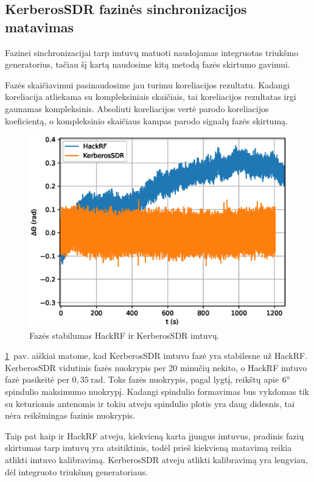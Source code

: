 \documentclass[main.tex]{subfiles}
\begin{document}
\subsection{KerberosSDR fazinės sinchronizacijos matavimas}

Fazinei sinchronizacijai tarp imtuvų matuoti naudojamas integruotas triukšmo generatorius,
tačiau šį kartą naudosime kitą metodą fazės skirtumo gavimui.

Fazės skaičiavimui pasinaudosime jau turimu koreliacijos rezultatu. Kadangi koreliacija
atliekama su kompleksiniais skaičiais, tai koreliacijos rezultatas irgi gaunamas kompleksinis.
Absoliuti koreliacijos vertė parodo koreliacijos koeficientą, o kompleksinio skaičiaus kampas
parodo signalų fazės skirtumą.

\begin{figure}[h]
    \begin{centering}
    \includegraphics[scale=1.0]{drawings/hackrdf_vs_kerberos_phase_over_time.eps}
    \par\end{centering}
    \protect\caption{\label{fig:phase_stability}Fazės stabilumas HackRF ir KerberosSDR imtuvų.}
\end{figure}

\ref{fig:phase_stability}~pav. aiškiai matome, kad KerberosSDR imtuvo fazė yra 
stabilesne už HackRF. KerberosSDR vidutinis fazės nuokrypis per 20 minučių nekito,
o HackRF imtuvo fazė pasikeitė per $0,35\ \mathrm{rad}$. Toks fazės nuokrypis, pagal
 lygtį, reikštų apie $6\degree$ spindulio maksimumo nuokrypį.
Kadangi spindulio formavimas bus vykdomas tik su keturiomis antenomis ir tokiu atveju
spindulio plotis yra daug didesnis, tai nėra reikšmingas fazinis nuokrypis.

Taip pat kaip ir HackRF atveju, kiekvieną karta įjungus imtuvus, pradinis fazių skirtumas
tarp imtuvų yra atsitiktinis, todėl prieš kiekvieną matavimą reikia atlikti imtuvo kalibravimą.
KerberosSDR atveju atlikti kalibravimą yra lengviau, dėl integruoto triukšmų generatoriaus.
\end{document}

